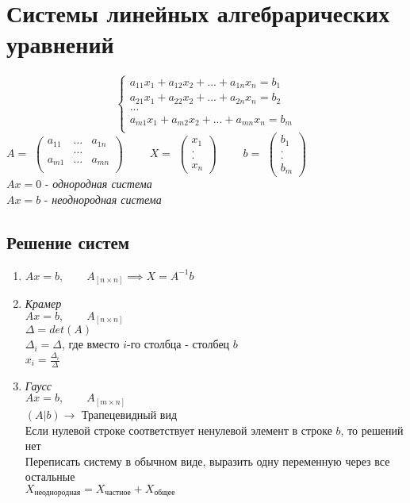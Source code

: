 \documentclass[12pt]{article}
\begin{document}
\section{Системы линейных алгебрарических уравнений}
\begin{equation*}
	\begin{cases*}
		a_{11}x_1+a_{12}x_2+ ... + a_{1n}x_n=b_1\\
		a_{21}x_1+a_{22}x_2+ ... + a_{2n}x_n=b_2\\
		...\\
		a_{m1}x_1+a_{m2}x_2+ ... + a_{mn}x_n=b_m\\
	\end{cases*}
\end{equation*}
$A = $
\ensuremath{
	\begin{pmatrix}
		a_{11} & ...  & a_{1n}\\
		&...&\\
		a_{m1} & ... & a_{mn}\\
	\end{pmatrix}
}
$\qquad X = $
\ensuremath{
	\begin{pmatrix}
		x_1\\
		.\\
		.\\
		x_n
	\end{pmatrix}
}
$\qquad b =$
\ensuremath{
	\begin{pmatrix}
		b_1\\
		.\\
		.\\
		b_m
	\end{pmatrix}
} \vspace{.4cm}\\
$Ax=0 $ - \emph{однородная система}\\
$Ax=b $ - \emph{неоднородная система}\\
\subsection{Решение систем}

\begin{enumerate}
	\item {
	$Ax=b, \qquad A_{[n \times n]} \implies X = A^{-1}b$	
}
	\item { \textit{Крамер}\\
		$Ax=b,  \qquad A_{[n \times n]}$\\
		$\Delta=det(A)$\\
		$\Delta_{i}=\Delta$, где вместо $i$-го столбца - столбец $b$\\
		$x_i=\frac{\Delta_i}{\Delta}$
}
	\item {\textit{Гаусс}\\
	$Ax=b,  \qquad A_{[m \times n]}$\\
	$(A|b) \rightarrow$ Трапецевидный вид\\
	Если нулевой строке соответствует ненулевой элемент в строке $b$, то решений нет\\
	Переписать систему в обычном виде, выразить одну переменную через все остальные\\
	$X_{\text{неоднородная}}=X_{\text{частное}}+X_{\text{общее}}$
}
\end{enumerate}
\end{document}
